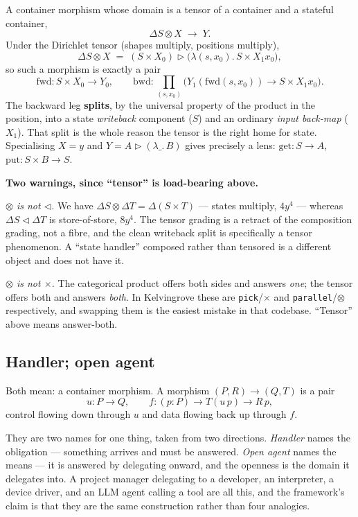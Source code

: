 \documentclass[11pt,a4paper]{article}
\newcommand{\code}[1]{\texttt{\small #1}}
\newcommand{\cont}{\mathbin{\triangleright}}
\newcommand{\comp}{\mathbin{\triangleleft}}
\begin{document}
A container morphism whose domain is a tensor of a container and a stateful container,
\[
  \Delta S \otimes X \;\longrightarrow\; Y .
\]
Under the Dirichlet tensor (shapes multiply, positions multiply),
\[
  \Delta S \otimes X \;=\; (S \times X_0) \cont \bigl(\lambda(s,x_0).\,S \times X_1 x_0\bigr),
\]
so such a morphism is exactly a pair
\[
  \mathrm{fwd} : S \times X_0 \longrightarrow Y_0,
  \qquad
  \mathrm{bwd} : \textstyle\prod_{(s,x_0)}\bigl(Y_1(\mathrm{fwd}(s,x_0)) \longrightarrow S \times X_1 x_0\bigr).
\]
The backward leg \textbf{splits}, by the universal property of the product in the position, into a
state \emph{writeback} component ($S$) and an ordinary \emph{input back-map} ($X_1$). That split is
the whole reason the tensor is the right home for state. Specialising $X = y$ and
$Y = A \cont (\lambda\_.\,B)$ gives precisely a lens: $\mathrm{get} : S \to A$,
$\mathrm{put} : S \times B \to S$.

\medskip
\noindent\textbf{Two warnings, since ``tensor'' is load-bearing above.}

\emph{$\otimes$ is not $\comp$.} We have $\Delta S \otimes \Delta T = \Delta(S \times T)$ --- states
multiply, $4y^4$ --- whereas $\Delta S \comp \Delta T$ is store-of-store, $8y^4$. The tensor
grading is a retract of the composition grading, not a fibre, and the clean writeback split is
specifically a tensor phenomenon. A ``state handler'' composed rather than tensored is a different
object and does not have it.

\emph{$\otimes$ is not $\times$.} The categorical product offers both sides and answers
\emph{one}; the tensor offers both and answers \emph{both}. In Kelvingrove these are
\code{pick}/\code{$\times$} and \code{parallel}/\code{$\otimes$} respectively, and swapping them is
the easiest mistake in that codebase. ``Tensor'' above means answer-both.

\subsection{Handler; open agent}

Both mean: a container morphism. A morphism $(P,R) \to (Q,T)$ is a pair
\[
  u : P \longrightarrow Q,
  \qquad
  f : (p : P) \longrightarrow T(u\,p) \longrightarrow R\,p ,
\]
control flowing down through $u$ and data flowing back up through $f$.

They are two names for one thing, taken from two directions. \emph{Handler} names the obligation
--- something arrives and must be answered. \emph{Open agent} names the means --- it is answered by
delegating onward, and the openness is the domain it delegates into. A project manager delegating
to a developer, an interpreter, a device driver, and an LLM agent calling a tool are all this, and
the framework's claim is that they are the same construction rather than four analogies.
\end{document}
